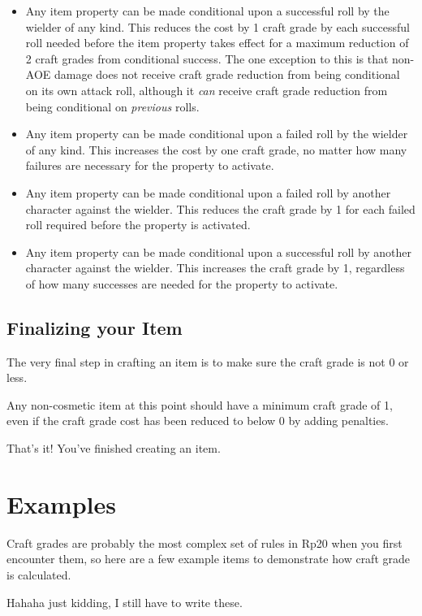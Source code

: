 \begin{itemize}
\item Any item property can be made conditional upon a successful roll by the wielder of any kind. This reduces the cost by 1 craft grade by each successful roll needed before the item property takes effect for a maximum reduction of 2 craft grades from conditional success. The one exception to this is that non-AOE damage does not receive craft grade reduction from being conditional on its own attack roll, although it \emph{can} receive craft grade reduction from being conditional on \emph{previous} rolls.

\item Any item property can be made conditional upon a failed roll by the wielder of any kind. This increases the cost by one craft grade, no matter how many failures are necessary for the property to activate.

\item Any item property can be made conditional upon a failed roll by another character against the wielder. This reduces the craft grade by 1 for each failed roll required before the property is activated.

\item Any item property can be made conditional upon a successful roll by another character against the wielder. This increases the craft grade by 1, regardless of how many successes are needed for the property to activate.
\end{itemize}

\subsection{Finalizing your Item}
The very final step in crafting an item is to make sure the craft grade is not 0 or less.

Any non-cosmetic item at this point should have a minimum craft grade of 1, even if the craft grade cost has been reduced to below 0 by adding penalties.

That's it! You've finished creating an item.

\section{Examples}
Craft grades are probably the most complex set of rules in Rp20 when you first encounter them, so here are a few example items to demonstrate how craft grade is calculated.

Hahaha just kidding, I still have to write these.

